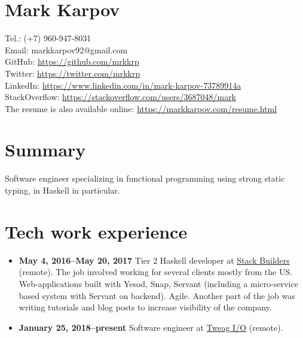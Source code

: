 \documentclass[a4paper,12pt]{article}
\begin{document}

\section*{Mark Karpov}

Tel.: (+7) 960-947-8031\\
Email: markkarpov92@gmail.com\\
GitHub: \href{https://github.com/mrkkrp}{https://github.com/mrkkrp}\\
Twitter: \href{https://twitter.com/mrkkrp}{https://twitter.com/mrkkrp}\\
LinkedIn: \href{https://www.linkedin.com/in/mark-karpov-73789914a}{https://www.linkedin.com/in/mark-karpov-73789914a}\\
StackOverflow: \href{https://stackoverflow.com/users/3687048/mark}{https://stackoverflow.com/users/3687048/mark}\\
The resume is also available online: \href{https://markkarpov.com/resume.html}{https://markkarpov.com/resume.html}

\sectionfont{\fontsize{12}{15}\selectfont\sectionrule{0pt}{0pt}{-5pt}{0.8pt}}

\section*{Summary}

Software engineer specializing in functional programming using strong static
typing, in Haskell in particular.

\section*{Tech work experience}

\begin{itemize}[noitemsep]
\item \textbf{May 4, 2016--May 20, 2017} Tier 2 Haskell developer at
  \href{https://www.stackbuilders.com/}{Stack Builders} (remote). The job
  involved working for several clients mostly from the US. Web-applications
  built with Yesod, Snap, Servant (including a micro-service based system
  with Servant on backend). Agile. Another part of the job was writing
  tutorials and blog posts to increase visibility of the company.
\item \textbf{January 25, 2018--present} Software engineer at
  \href{https://tweag.io}{Tweag I/O} (remote).
\end{itemize}
\end{document}

